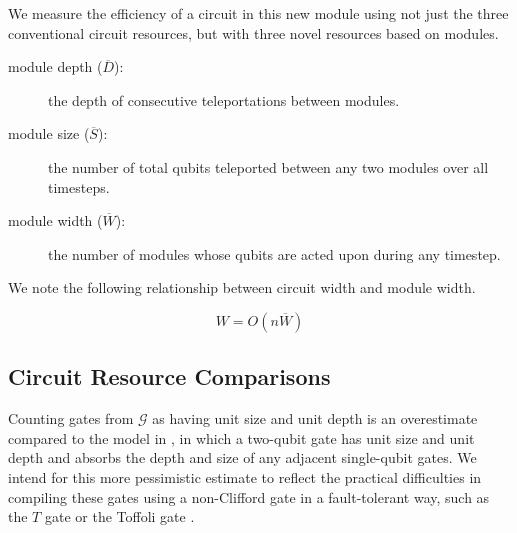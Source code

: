 We measure the efficiency of a circuit in this new module using not just
the three conventional circuit resources, but with three novel resources
based on modules.

\begin{description}

\item[module depth ($\overline{D}$):] the depth of consecutive teleportations between modules.
\item[module size ($\overline{S}$):] the number of total qubits teleported between any two modules over all timesteps.
\item[module width ($\overline{W}$):] the number of modules whose qubits are
acted upon during any timestep.

\end{description}



We note the following relationship between circuit width and
module width.

\begin{equation}
W = O(n\overline{W})
\label{eqn:module-width}
\end{equation}

\subsection{Circuit Resource Comparisons}

Counting gates from $\mathcal{G}$ as having unit size and unit depth
is
an overestimate compared to the model in \cite{Kutin2006}, in which a
two-qubit gate has unit size and unit depth and
absorbs the depth and size of any adjacent single-qubit gates. We intend
for this more pessimistic estimate to reflect the practical difficulties
in compiling these gates using a non-Clifford gate in a fault-tolerant way,
such as the $T$ gate or the Toffoli gate
\cite{Fowler2011}.

